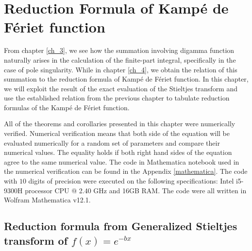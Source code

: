 \chapter{Reduction Formula of Kampé de Fériet function}


\label{ch_5}
\hspace{\parindent}

From chapter \ref{ch_3}, we see how the summation involving digamma function naturally arises in the calculation of the finite-part integral, specifically in the case of pole singularity. While in chapter \ref{ch_4}, we obtain the relation of this summation to the reduction formula of Kampé de Fériet function. In this chapter, we will exploit the result of the exact evaluation of the Stieltjes transform and use the established relation from the previous chapter to tabulate reduction formulas of the Kampé de Fériet function. 

All of the theorems and corollaries presented in this chapter were numerically verified. Numerical verification means that both side of the equation will be evaluated numerically for a random set of parameters and compare their numerical values. The equality holds if both right hand sides of the equation agree to the same numerical value. The code in Mathematica notebook used in the numerical verification can be found in the Appendix \ref{mathematica}. The code with $10$ digits of precision were executed on the following specifications: Intel i5-9300H processor CPU @ 2.40 GHz and 16GB RAM. The code were all written in Wolfram Mathematica v12.1.

\section{Reduction formula from Generalized Stieltjes transform of $f(x) = e^{-bx}$}

